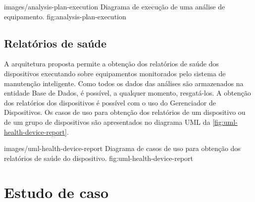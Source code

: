   {images/analysis-plan-execution}
  {Diagrama de execução de uma análise de equipamento.}
  {fig:analysis-plan-execution}


%
%


\subsection{Relatórios de saúde}

A arquitetura proposta permite a obtenção dos relatórios de saúde dos dispositivos executando sobre
equipamentos monitorados pelo sistema de manutenção inteligente. Como todos os dados das análises
são armazenados na entidade Base de Dados, é possível, a qualquer momento, resgatá-los. A obtenção
dos relatórios dos dispositivos é possível com o uso do Gerenciador de Dispositivos. Os casos de uso
para obtenção dos relatórios de um dispositivo ou de um grupo de dispositivos são apresentados no
diagrama \gls{UML} da \cref{fig:uml-health-device-report}.

  {images/uml-health-device-report}
  {Diagrama de casos de uso para obtenção dos relatórios de saúde do dispositivo.}
  {fig:uml-health-device-report}


\section{Estudo de caso}
\label{sec:estudo-caso}

